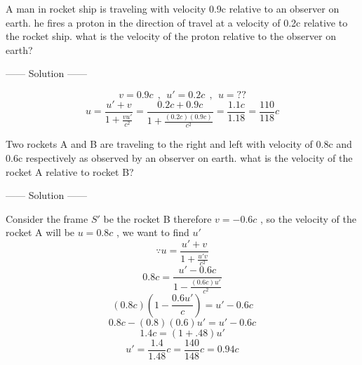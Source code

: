 \begin{example}
A man in rocket ship is traveling with velocity 0.9c relative to an observer on earth.
he fires a proton in the direction of travel at a velocity of 0.2c relative to the rocket ship. what is the velocity of the proton relative to the observer on earth?
\begin{center}
    ------ \textcolor{Solution}{Solution} ------
\end{center}
\[
    v = 0.9c \ \ , \ \ u' = 0.2c \ \ , \ \ u = ??    
\]
\[
u = \frac{u' + v}{1 + \frac{vu'}{c^2}} = \frac{0.2c + 0.9c}{1 + \frac{(0.2c)(0.9c)}{c^2}} = \frac{1.1c}{1.18} = \frac{110}{118}c
\]
\end{example}
\begin{example}
    Two rockets A and B are traveling to the right and left with velocity of 0.8c and 0.6c respectively as observed by an observer on earth. what is the velocity of the rocket A relative to rocket B?
\begin{center}
    ------ \textcolor{Solution}{Solution} ------
\end{center}

\begin{center}
\end{center}
Consider the frame $S'$ be the rocket B therefore $v =-0.6c$ , so the velocity of the rocket A will be $u = 0.8c$ , we want to find $u'$
\[
\because u = \frac{u'+v}{1+\frac{u'v}{c^2}}    
\]
\[
    0.8c = \frac{u'-0.6c}{1-\frac{(0.6c)u'}{c^2}}    
\]
\[
(0.8c)\left(1-\frac{0.6u'}{c}\right) = u' - 0.6c
\]
\[
    0.8c-(0.8)(0.6)u' = u' - 0.6c
\]
\[
1.4c = (1+.48)u' 
\]
\[
u' =\frac{1.4}{1.48}c = \frac{140}{148}c = 0.94c
\]
\end{example}
